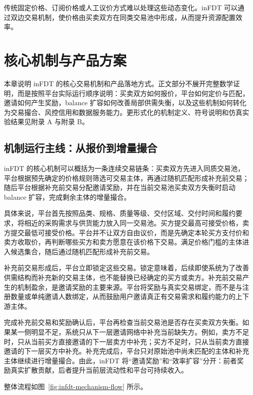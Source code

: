 \documentclass[UTF8,a4paper,12pt]{ctexart}
\begin{document}
传统固定价格、订阅价格或人工议价方式难以处理这些动态变化。inFDT 可以通过双边交易机制，使价格由买卖双方在同类交易池中形成，从而提升资源配置效率。


\newpage
\section{核心机制与产品方案}

本章说明 inFDT 的核心交易机制和产品落地方式。正文部分不展开完整数学证明，而是按照平台实际运行顺序说明：买卖双方如何报价，平台如何定价与匹配，邀请如何产生奖励，balance 扩容如何改善局部供需失衡，以及这些机制如何转化为交易撮合、风控信用和数据服务能力。更形式化的机制定义、符号说明和仿真实验结果见附录 A 与附录 B。

\subsection{机制运行主线：从报价到增量撮合}

inFDT 的核心机制可以概括为一条连续交易链条：买卖双方先进入同质交易池，平台根据预先确定的价格规则筛选可交易主体，再通过随机匹配形成补充前交易；随后平台根据补充前交易分配邀请奖励，并在当前交易池买卖双方失衡时启动 balance 扩容，完成剩余主体的增量撮合。

具体来说，平台首先按照品类、规格、质量等级、交付区域、交付时间和履约要求，将相近的采购需求与供货能力放入同一交易池。买方提交最高可接受价格，卖方提交最低可接受价格。平台并不让双方自由议价，而是先确定本轮买方支付价和卖方收取价，再判断哪些买方和卖方愿意在该价格下交易。满足价格门槛的主体进入候选集合，随后通过随机匹配形成补充前交易。

补充前交易形成后，平台立即锁定这些交易。锁定意味着，后续即使系统为了改善供需结构而补充新的交易主体，也不能替换已经确定的买方或卖方。补充前交易产生的机制盈余，是邀请奖励的主要来源。平台将奖励与真实交易绑定，而不是与注册数量或单纯邀请人数绑定，从而鼓励用户邀请真正有交易需求和履约能力的上下游主体。

完成补充前交易和奖励确认后，平台再检查当前交易池是否存在买卖双方失衡。如果某一侧明显不足，系统只从下一层邀请网络中补充当前缺失方。例如，卖方不足时，只从当前买方直接邀请的下一层卖方中补充；买方不足时，只从当前卖方直接邀请的下一层买方中补充。补充完成后，平台只对原始池中尚未匹配的主体和补充主体继续进行增量撮合。由此，inFDT 将“邀请奖励”和“效率扩容”分开：前者奖励真实扩散贡献，后者提升当前层流动性和平台可持续收入。

整体流程如图~\ref{fig:infdt-mechanism-flow} 所示。

\end{document}
